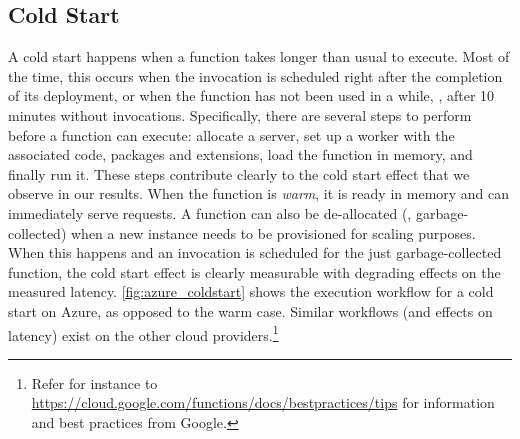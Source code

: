 
\subsection{Cold Start}
\label{sec:coldstart}
A cold start happens when a function takes longer than usual to execute. 
Most of the time, this occurs when the invocation is scheduled right after the completion of its deployment, or when the function has not been used in a while, \eg, after 10 minutes without invocations.
Specifically, there are several steps to perform before a function can execute: allocate a server, set up a worker with the associated code, packages and extensions, load the function in memory, and finally run it.
These steps contribute clearly to the cold start effect that we observe in our results.
When the function is \emph{warm}, it is ready in memory and can immediately serve requests.
A function can also be de-allocated (\ie, garbage-collected) when a new instance needs to be provisioned for scaling purposes. 
When this happens and an invocation is scheduled for the just garbage-collected function, the cold start effect is clearly measurable with degrading effects on the measured latency.
\autoref{fig:azure_coldstart} shows the execution workflow for a cold start on Azure, as opposed to the warm case. 
Similar workflows (and effects on latency) exist on the other cloud providers.\footnote{Refer for instance to \url{https://cloud.google.com/functions/docs/bestpractices/tips} for information and best practices from Google.}

